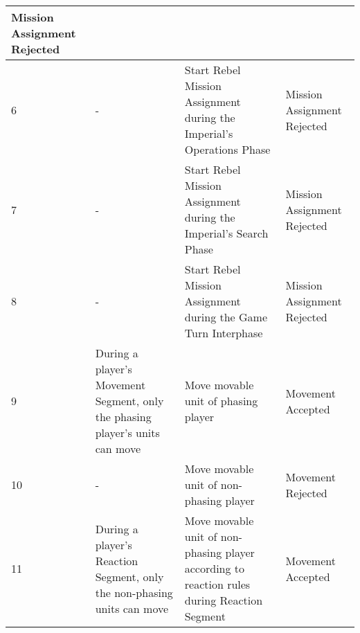 \begin{center}
\begin{longtable}{| p{.5cm} | p{4.5cm} | p{4.5cm} | p{4.5cm} |}
    Mission Assignment Rejected
    
    \\ \hline 
    
    6 &
    
    - &
    
    Start Rebel Mission Assignment during the Imperial's Operations Phase &
    
    Mission Assignment Rejected
    
    \\ \hline 
    
    7 &
    
    - &
    
    Start Rebel Mission Assignment during the Imperial's Search Phase &
    
    Mission Assignment Rejected
    
    \\ \hline 
    
    8 &
    
    - &
    
    Start Rebel Mission Assignment during the Game Turn Interphase &
    
    Mission Assignment Rejected
    
    \\ \hline 
    
    9 & 
    
    During a player's Movement Segment, only the phasing player's units can move &
    
    Move movable unit of phasing player &
    
    Movement Accepted
    
    \\ \hline 
    
    10 &
    
    - &
    
    Move movable unit of non-phasing player &
    
    Movement Rejected
    
    \\ \hline 
    
    11 &
    
    During a player's Reaction Segment, only the non-phasing units can move &
    
    Move movable unit of non-phasing player according to reaction rules during Reaction Segment &
    
    Movement Accepted
    
    \\ \hline 
    

\end{longtable}
\end{center}
